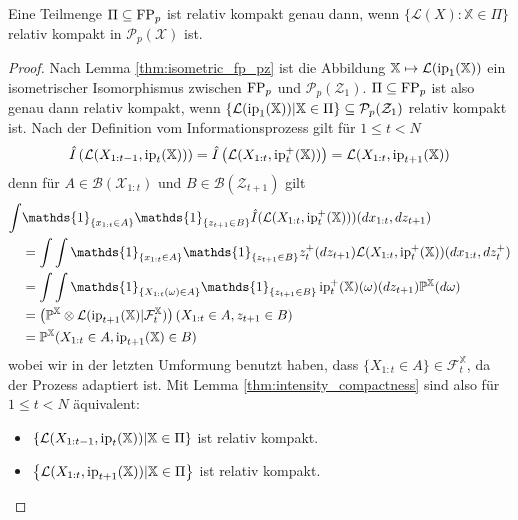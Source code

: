 \begin{theorem}\label{thm:compactness_characterization}
    Eine Teilmenge $\Pi \subseteq \operatorname{FP}_p$ ist relativ kompakt genau dann, wenn $\{\mathcal{L}(X): \mathbb{X} \in \Pi\}$ relativ kompakt in $\mathcal{P}_p(\mathcal{X})$ ist.
\end{theorem}
\begin{proof}
    Nach Lemma \ref{thm:isometric_fp_pz} ist die Abbildung $\mathbb{X} \mapsto \mathcal{L}(\operatorname{ip}_1(\mathbb{X}))$ ein isometrischer Isomorphismus zwischen $\operatorname{FP}_p$ und $\mathcal{P}_p(\mathcal{Z}_1)$. $\Pi \subseteq \operatorname{FP}_p$ ist also genau dann relativ kompakt, wenn $\left\{\mathcal{L}(\operatorname{ip}_1(\mathbb{X})) \vert \mathbb{X} \in \Pi\right\} \subseteq \mathcal{P}_p(\mathcal{Z}_1)$ relativ kompakt ist. Nach der Definition vom Informationsprozess gilt für $1\leq t < N$
    $$\hat{I}\left(\mathcal{L}(X_{1:t-1}, \operatorname{ip}_t(\mathbb{X}))\right) = \hat{I}\left(\mathcal{L}(X_{1:t}, \operatorname{ip}_t^+(\mathbb{X}))\right) = \mathcal{L}(X_{1:t}, \operatorname{ip}_{t+1}(\mathbb{X}))$$
    denn für $A \in \mathcal{B}(\mathcal{X}_{1:t})$ und $B \in \mathcal{B}(\mathcal{Z}_{t+1})$ gilt 
    \begin{align*}
        \int &\mathds{1}_{\{x_{1:t} \in A\}} \mathds{1}_{\{z_{t+1} \in B\}} \hat{I}(\mathcal{L}(X_{1:t}, \ip_t^+(\mathbb{X})))(dx_{1:t}, dz_{t+1}) \\
        &= \int \int \mathds{1}_{\{x_{1:t} \in A\}} \mathds{1}_{\{z_{t+1} \in B\}} z_t^+(dz_{t+1}) \mathcal{L}(X_{1:t}, \ip_t^+(\mathbb{X}))(dx_{1:t}, dz_t^+) \\
        &= \int \int \mathds{1}_{\{X_{1:t}(\omega)\in A\}} \mathds{1}_{\{z_{t+1} \in B\}} \ip_t^+(\mathbb{X})(\omega)(dz_{t+1}) \mathbb{P}^\mathbb{X}(d\omega) \\
        &= \left(\mathbb{P}^{\mathbb{X}} \otimes \mathcal{L}(\ip_{t+1}(\mathbb{X}) \vert \mathcal{F}_t^\mathbb{X})\right)(X_{1:t} \in A, z_{t+1} \in B) \\ 
        &= \mathbb{P}^\mathbb{X}(X_{1:t} \in A, \ip_{t+1}(\mathbb{X}) \in B)
    \end{align*}
    wobei wir in der letzten Umformung benutzt haben, dass $\{X_{1:t} \in A\} \in \mathcal{F}_t^\mathbb{X}$, da der Prozess adaptiert ist. Mit Lemma \ref{thm:intensity_compactness} sind also für $1 \leq t < N$ äquivalent:
    \begin{itemize}
        \item $\left\{ \mathcal{L}(X_{1:t-1}, \operatorname{ip}_t(\mathbb{X})) \vert \mathbb{X} \in \Pi\right\}$ ist relativ kompakt. 
        \item $\left\{ \mathcal{L}(X_{1:t}, \operatorname{ip}_{t+1}(\mathbb{X})) \vert \mathbb{X} \in \Pi\right\}$ ist relativ kompakt. 

\end{itemize}
\end{proof}
